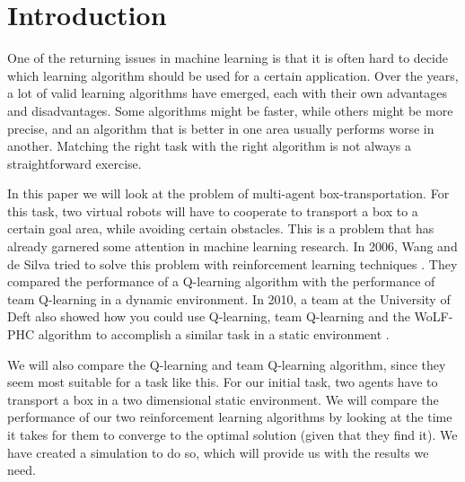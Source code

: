 \section{Introduction}
One of the returning issues in machine learning is that it is often hard to decide which learning algorithm should be used for a certain application. Over the years, a lot of valid learning algorithms have emerged, each with their own advantages and disadvantages. Some algorithms might be faster, while others might be more precise, and an algorithm that is better in one area usually performs worse in another. Matching the right task with the right algorithm is not always a straightforward exercise.

In this paper we will look at the problem of multi-agent box-transportation.  For this task, two virtual robots will have to cooperate to transport a box to a certain goal area, while avoiding certain obstacles. This is a problem that has already garnered some attention in machine learning research. In 2006, Wang and de Silva tried to solve this problem with reinforcement learning techniques \cite{wang2006}. They compared the performance of a Q-learning algorithm with the performance of team Q-learning in a dynamic environment. In 2010, a team at the University of Deft also showed how you could use Q-learning, team Q-learning and the WoLF-PHC algorithm to accomplish a similar task in a static environment \cite{busoniu2010}.

We will also compare the Q-learning and team Q-learning algorithm, since they seem most suitable for a task like this. For our initial task, two agents have to transport a box in a two dimensional static environment. We will compare the performance of our two reinforcement learning algorithms by looking at the time it takes for them to converge to the optimal solution (given that they find it). We have created a simulation to do so, which will provide us with the results we need.
